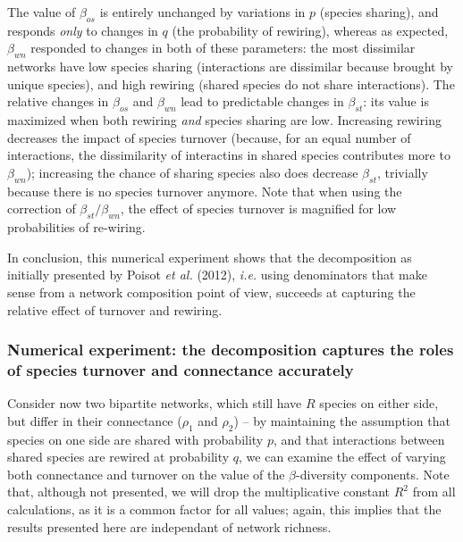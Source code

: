 \documentclass[10pt,oneside]{article}
\begin{document}
The value of \(\beta_{os}\) is entirely unchanged by variations in \(p\)
(species sharing), and responds \emph{only} to changes in \(q\) (the
probability of rewiring), whereas as expected, \(\beta_{wn}\) responded
to changes in both of these parameters: the most dissimilar networks
have low species sharing (interactions are dissimilar because brought by
unique species), and high rewiring (shared species do not share
interactions). The relative changes in \(\beta_{os}\) and \(\beta_{wn}\)
lead to predictable changes in \(\beta_{st}\): its value is maximized
when both rewiring \emph{and} species sharing are low. Increasing
rewiring decreases the impact of species turnover (because, for an equal
number of interactions, the dissimilarity of interactins in shared
species contributes more to \(\beta_{wn}\)); increasing the chance of
sharing species also does decrease \(\beta_{st}\), trivially because
there is no species turnover anymore. Note that when using the
correction of \(\beta_{st}/\beta_{wn}\), the effect of species turnover
is magnified for low probabilities of re-wiring.

In conclusion, this numerical experiment shows that the decomposition as
initially presented by Poisot \emph{et al.} (2012), \emph{i.e.} using
denominators that make sense from a network composition point of view,
succeeds at capturing the relative effect of turnover and rewiring.

\hypertarget{numerical-experiment-the-decomposition-captures-the-roles-of-species-turnover-and-connectance-accurately}{%
\subsubsection{Numerical experiment: the decomposition captures the
roles of species turnover and connectance
accurately}\label{numerical-experiment-the-decomposition-captures-the-roles-of-species-turnover-and-connectance-accurately}}

Consider now two bipartite networks, which still have \(R\) species on
either side, but differ in their connectance (\(\rho_1\) and \(\rho_2\))
-- by maintaining the assumption that species on one side are shared
with probability \(p\), and that interactions between shared species are
rewired at probability \(q\), we can examine the effect of varying both
connectance and turnover on the value of the \(\beta\)-diversity
components. Note that, although not presented, we will drop the
multiplicative constant \(R^2\) from all calculations, as it is a common
factor for all values; again, this implies that the results presented
here are independant of network richness.
\end{document}
